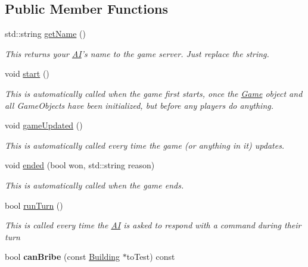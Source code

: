 \subsection*{Public Member Functions}
\begin{DoxyCompactItemize}
\item 
std\-::string \hyperlink{classAnarchy_1_1AI_a85abf255935e41d562672b9f0ae18161}{get\-Name} ()
\begin{DoxyCompactList}\small\item\em This returns your \hyperlink{classAnarchy_1_1AI}{A\-I}'s name to the game server. Just replace the string. \end{DoxyCompactList}\item 
void \hyperlink{classAnarchy_1_1AI_aa3e5c1b43bfb7e2dd17a281a5344ce66}{start} ()
\begin{DoxyCompactList}\small\item\em This is automatically called when the game first starts, once the \hyperlink{classAnarchy_1_1Game}{Game} object and all Game\-Objects have been initialized, but before any players do anything. \end{DoxyCompactList}\item 
void \hyperlink{classAnarchy_1_1AI_abd80d138a560c8c8e5610cbbb9f7e434}{game\-Updated} ()
\begin{DoxyCompactList}\small\item\em This is automatically called every time the game (or anything in it) updates. \end{DoxyCompactList}\item 
void \hyperlink{classAnarchy_1_1AI_ad97ef7981850e5b0f2af26582746c1b8}{ended} (bool won, std\-::string reason)
\begin{DoxyCompactList}\small\item\em This is automatically called when the game ends. \end{DoxyCompactList}\item 
bool \hyperlink{classAnarchy_1_1AI_a8f4d08c347f19c4c77fe72291b29235c}{run\-Turn} ()
\begin{DoxyCompactList}\small\item\em This is called every time the \hyperlink{classAnarchy_1_1AI}{A\-I} is asked to respond with a command during their turn \end{DoxyCompactList}\item 
\hypertarget{classAnarchy_1_1AI_a7802b3dc7bfde3c4d5f6a0d4f46aae12}{bool {\bfseries can\-Bribe} (const \hyperlink{classAnarchy_1_1Building}{Building} $\ast$to\-Test) const }\label{classAnarchy_1_1AI_a7802b3dc7bfde3c4d5f6a0d4f46aae12}

\end{DoxyCompactItemize}
